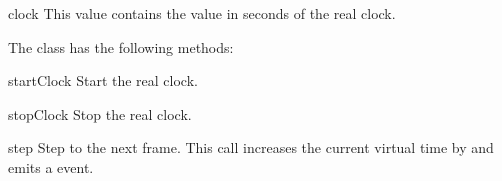 \begin{datadesc}{clock}
This value contains the value in seconds of the real clock.
\end{datadesc}


The  class has the following methods:

\begin{methoddesc}{startClock}{}
Start the real clock.
\end{methoddesc}

\begin{methoddesc}{stopClock}{}
Stop the real clock.
\end{methoddesc}

\begin{methoddesc}{step}{}
Step to the next frame. This call increases the current virtual time by
 and emits a  event.
\end{methoddesc}

